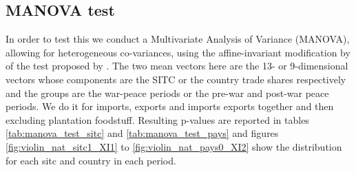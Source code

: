 \documentclass[12pt,a4paper,notitlepage,english]{article}
\begin{document}
\begin{appendix}
\subsection{MANOVA test}

In order to test this we conduct a Multivariate Analysis of Variance (MANOVA), allowing for heterogeneous co-variances, using the affine-invariant modification by \cite{Krishnamoorthy2004} of the test proposed by \cite{Nel1986}. The two mean vectors here are the 13- or 9-dimensional vectors whose components are the SITC or the country trade shares respectively and the groups are the war-peace periods or the pre-war and post-war peace periods. 
We do it for imports, exports and imports exports together and then excluding plantation foodstuff. Resulting p-values are reported in tables \ref{tab:manova_test_sitc} and \ref{tab:manova_test_pays} and figures \ref{fig:violin_nat_sitc1_XI1} to \ref{fig:violin_nat_pays0_XI2} show the distribution for each sitc and country in each period. \\

\end{appendix}
\end{document}
